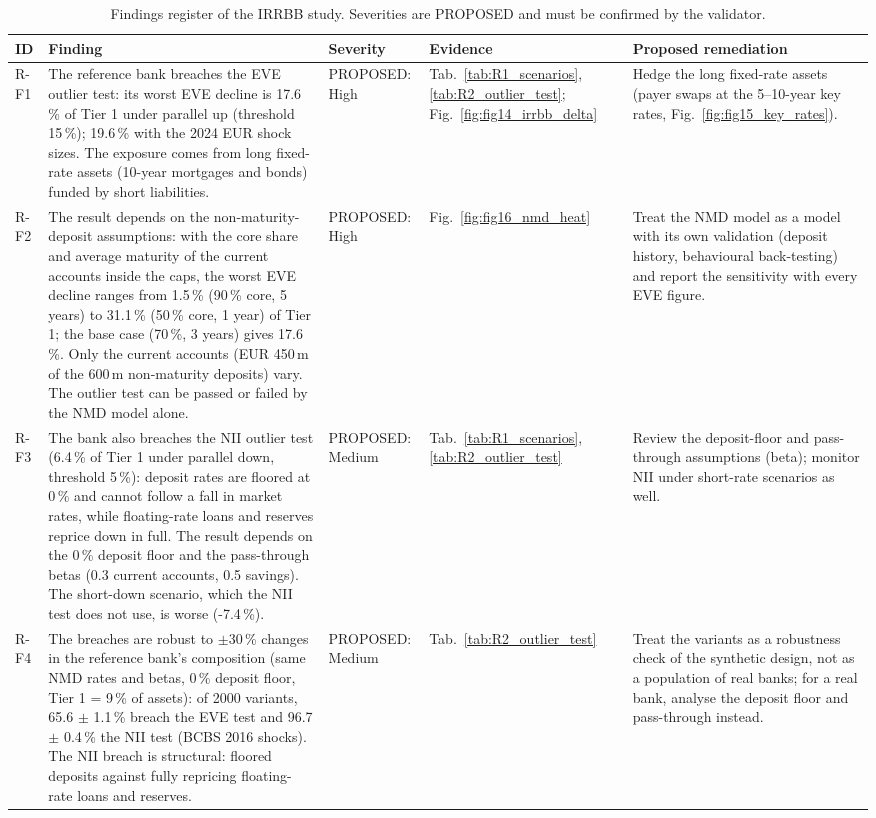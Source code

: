 \begin{table}[H]
\centering
\scriptsize
\caption{Findings register of the IRRBB study. Severities are PROPOSED and must be confirmed by the validator.}
\label{tab:R4_findings}
\setlength{\tabcolsep}{3pt}
\begin{tabular}{>{\raggedright\arraybackslash}p{0.75cm}>{\raggedright\arraybackslash}p{6.6cm}>{\raggedright\arraybackslash}p{1.85cm}>{\raggedright\arraybackslash}p{2.4cm}>{\raggedright\arraybackslash}p{3.5cm}}
\toprule
ID & Finding & Severity & Evidence & Proposed remediation \\
\midrule
R-F1 & The reference bank breaches the EVE outlier test: its worst EVE decline is 17.6\,\% of Tier 1 under parallel up (threshold 15\,\%); 19.6\,\% with the 2024 EUR shock sizes. The exposure comes from long fixed-rate assets (10-year mortgages and bonds) funded by short liabilities. & PROPOSED: High & Tab.~\ref{tab:R1_scenarios}, \ref{tab:R2_outlier_test}; Fig.~\ref{fig:fig14_irrbb_delta} & Hedge the long fixed-rate assets (payer swaps at the 5--10-year key rates, Fig.~\ref{fig:fig15_key_rates}). \\
R-F2 & The result depends on the non-maturity-deposit assumptions: with the core share and average maturity of the current accounts inside the caps, the worst EVE decline ranges from 1.5\,\% (90\,\% core, 5 years) to 31.1\,\% (50\,\% core, 1 year) of Tier 1; the base case (70\,\%, 3 years) gives 17.6\,\%. Only the current accounts (EUR 450\,m of the 600\,m non-maturity deposits) vary. The outlier test can be passed or failed by the NMD model alone. & PROPOSED: High & Fig.~\ref{fig:fig16_nmd_heat} & Treat the NMD model as a model with its own validation (deposit history, behavioural back-testing) and report the sensitivity with every EVE figure. \\
R-F3 & The bank also breaches the NII outlier test (6.4\,\% of Tier 1 under parallel down, threshold 5\,\%): deposit rates are floored at 0\,\% and cannot follow a fall in market rates, while floating-rate loans and reserves reprice down in full. The result depends on the 0\,\% deposit floor and the pass-through betas (0.3 current accounts, 0.5 savings). The short-down scenario, which the NII test does not use, is worse (-7.4\,\%). & PROPOSED: Medium & Tab.~\ref{tab:R1_scenarios}, \ref{tab:R2_outlier_test} & Review the deposit-floor and pass-through assumptions (beta); monitor NII under short-rate scenarios as well. \\
R-F4 & The breaches are robust to $\pm$30\,\% changes in the reference bank's composition (same NMD rates and betas, 0\,\% deposit floor, Tier 1 = 9\,\% of assets): of 2000 variants, 65.6 $\pm$ 1.1\,\% breach the EVE test and 96.7 $\pm$ 0.4\,\% the NII test (BCBS 2016 shocks). The NII breach is structural: floored deposits against fully repricing floating-rate loans and reserves. & PROPOSED: Medium & Tab.~\ref{tab:R2_outlier_test} & Treat the variants as a robustness check of the synthetic design, not as a population of real banks; for a real bank, analyse the deposit floor and pass-through instead. \\

\end{tabular}
\end{table}
